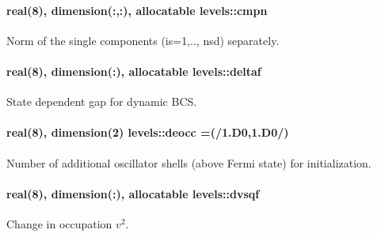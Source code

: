 \paragraph[{\texorpdfstring{cmpn}{cmpn}}]{\setlength{\rightskip}{0pt plus 5cm}real(8), dimension(\+:,\+:), allocatable levels\+::cmpn}\hypertarget{namespacelevels_ac517c8629a25b882f0a7b366e6426eec}{}\label{namespacelevels_ac517c8629a25b882f0a7b366e6426eec}


Norm of the single components ({\ttfamily is=1},.., {\ttfamily nsd}) separately. 

\paragraph[{\texorpdfstring{deltaf}{deltaf}}]{\setlength{\rightskip}{0pt plus 5cm}real(8), dimension(\+:), allocatable levels\+::deltaf}\hypertarget{namespacelevels_a948be7b0b8534179acced4d11ecf0f8c}{}\label{namespacelevels_a948be7b0b8534179acced4d11ecf0f8c}


State dependent gap for dynamic B\+CS. 

\paragraph[{\texorpdfstring{deocc}{deocc}}]{\setlength{\rightskip}{0pt plus 5cm}real(8), dimension(2) levels\+::deocc =(/1.\+D0,1.\+D0/)}\hypertarget{namespacelevels_a58c7797165cbe249571a4ada2e6d5a55}{}\label{namespacelevels_a58c7797165cbe249571a4ada2e6d5a55}


Number of additional oscillator shells (above Fermi state) for initialization. 

\paragraph[{\texorpdfstring{dvsqf}{dvsqf}}]{\setlength{\rightskip}{0pt plus 5cm}real(8), dimension(\+:), allocatable levels\+::dvsqf}\hypertarget{namespacelevels_a87fd2946b844fdbb5edd84ea122a7c14}{}\label{namespacelevels_a87fd2946b844fdbb5edd84ea122a7c14}


Change in occupation $ v^2 $. 

